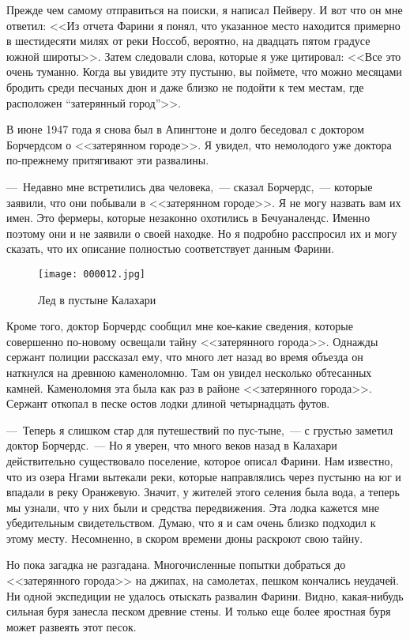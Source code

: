 \documentclass[12pt,a4paper,twoside,openany,svgnames]{memoir}
\begin{document}
Прежде чем самому отправиться на поиски, я написал Пейверу. И вот что он мне ответил: <<Из отчета Фарини я понял, что указанное место находится примерно в шестидесяти милях от реки Носсоб, вероятно, на двадцать пятом градусе южной широты>>. Затем следовали слова, которые я уже цитировал: <<Все это очень туманно. Когда вы увидите эту пустыню, вы поймете, что можно месяцами бродить среди песчаных дюн и даже близко не подойти к тем местам, где расположен ``затерянный город''>>.

В июне 1947 года я снова был в Апингтоне и долго беседовал с доктором Борчердсом о <<затерянном городе>>. Я увидел, что немолодого уже доктора по-прежнему притягивают эти развалины.

---~Недавно мне встретились два человека,~--- сказал Борчердс,~--- которые заявили, что они побывали в <<затерянном городе>>. Я не могу назвать вам их имен. Это фермеры, которые незаконно охотились в Бечуаналендс. Именно поэтому они и не заявили о своей находке. Но я подробно расспросил их и могу сказать, что их описание полностью соответствует данным Фарини.

\begin{figure}[ht!]
\centering
\texttt{[image: 000012.jpg]}
\caption{Лед в пустыне Калахари}
\label{overflow}
\end{figure}


Кроме того, доктор Борчердс сообщил мне кое-какие сведения, которые совершенно по-новому освещали тайну <<затерянного города>>. Однажды сержант полиции рассказал ему, что много лет назад во время объезда он наткнулся на древнюю каменоломню. Там он увидел несколько обтесанных камней. Каменоломня эта была как раз в районе <<затерянного города>>. Сержант откопал в песке остов лодки длиной четырнадцать футов.

---~Теперь я слишком стар для путешествий по пус-тыне,~--- с грустью заметил доктор Борчердс.~--- Но я уверен, что много веков назад в Калахари действительно существовало поселение, которое описал Фарини. Нам известно, что из озера Нгами вытекали реки, которые направлялись через пустыню на юг и впадали в реку Оранжевую. Значит, у жителей этого селения была вода, а теперь мы узнали, что у них были и средства передвижения. Эта лодка кажется мне убедительным свидетельством. Думаю, что я и сам очень близко подходил к этому месту. Несомненно, в скором времени дюны раскроют свою тайну.

Но пока загадка не разгадана. Многочисленные попытки добраться до <<затерянного города>> на джипах, на самолетах, пешком кончались неудачей. Ни одной экспедиции не удалось отыскать развалин Фарини. Видно, какая-нибудь сильная буря занесла песком древние стены. И только еще более яростная буря может развеять этот песок.
\end{document}
